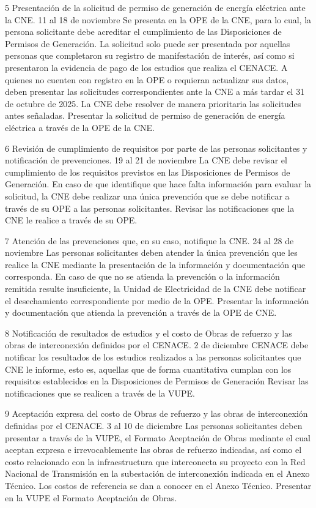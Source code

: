  5
 Presentación de la solicitud de permiso de generación de energía eléctrica ante la CNE.
 11 al 18 de noviembre
 Se presenta en la OPE de la CNE, para lo cual, la persona solicitante debe acreditar el cumplimiento de las Disposiciones de Permisos de Generación.
La solicitud solo puede ser presentada por aquellas personas que completaron su registro de manifestación de interés, así como si presentaron la evidencia de pago de los estudios que realiza el CENACE.
A quienes no cuenten con registro en la OPE o requieran actualizar sus datos, deben presentar las solicitudes correspondientes ante la CNE a más tardar el 31 de octubre de 2025.
La CNE debe resolver de manera prioritaria las solicitudes antes señaladas.
 Presentar la solicitud de permiso de generación de energía eléctrica a través de la OPE de la CNE.
 
 6
 Revisión de cumplimiento de requisitos por parte de las personas solicitantes y notificación de prevenciones.
 19 al 21 de noviembre
 La CNE debe revisar el cumplimiento de los requisitos previstos en las Disposiciones de Permisos de Generación.
En caso de que identifique que hace falta información para evaluar la solicitud, la CNE debe realizar una única prevención que se debe notificar a través de su OPE a las personas solicitantes.
 Revisar las notificaciones que la CNE le realice a través de su OPE.
 
 7
 Atención de las prevenciones que, en su caso, notifique la CNE.
 24 al 28 de noviembre
 Las personas solicitantes deben atender la única prevención que les realice la CNE mediante la presentación de la información y documentación que corresponda.
En caso de que no se atienda la prevención o la información remitida resulte insuficiente, la Unidad de Electricidad de la CNE debe notificar el desechamiento correspondiente por medio de la OPE.
 Presentar la información y documentación que atienda la prevención a través de la OPE de CNE.
 
 \par
8
 Notificación de resultados de estudios y el costo de Obras de refuerzo y las obras de interconexión definidos por el CENACE.
 2 de diciembre
 CENACE debe notificar los resultados de los estudios realizados a las personas solicitantes que CNE le informe, esto es, aquellas que de forma cuantitativa cumplan con los requisitos establecidos en la Disposiciones de Permisos de Generación
 Revisar las notificaciones que se realicen a través de la VUPE.
 
 9
 Aceptación expresa del costo de Obras de refuerzo y las obras de interconexión definidas por el CENACE.
 3 al 10 de diciembre
 Las personas solicitantes deben presentar a través de la VUPE, el Formato Aceptación de Obras mediante el cual aceptan expresa e irrevocablemente las obras de refuerzo indicadas, así como el costo relacionado con la infraestructura que interconecta su proyecto con la Red Nacional de Transmisión en la subestación de interconexión indicada en el Anexo Técnico.
Los costos de referencia se dan a conocer en el Anexo Técnico.
 Presentar en la VUPE el Formato Aceptación de Obras.
 

